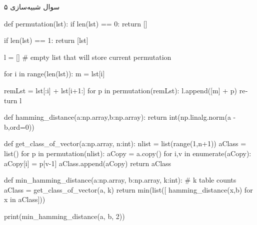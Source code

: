 سوال شبیه‌سازی ۵

\begin{latin}
\begin{python}
def permutation(lst):
    if len(lst) == 0:
        return []
 
    if len(lst) == 1:
        return [lst]
 
    l = [] # empty list that will store current permutation
 
    for i in range(len(lst)):
       m = lst[i]
 
       remLst = lst[:i] + lst[i+1:]
       for p in permutation(remLst):
           l.append([m] + p)
    return l


def hamming_distance(a:np.array,b:np.array):
    return int(np.linalg.norm(a - b,ord=0))
    
def get_class_of_vector(a:np.array, n:int):
    nlist = list(range(1,n+1))
    aClass = list()
    for p in permutation(nlist):
        aCopy = a.copy()
        for i,v in enumerate(aCopy):
            aCopy[i] = p[v-1]
        aClass.append(aCopy)
    return aClass

def min_hamming_distance(a:np.array, b:np.array, k:int): 
    # k table counts
    aClass = get_class_of_vector(a, k)  
    return min(list([ hamming_distance(x,b) for x in aClass]))
        
print(min_hamming_distance(a, b, 2))
\end{python}
\end{latin}